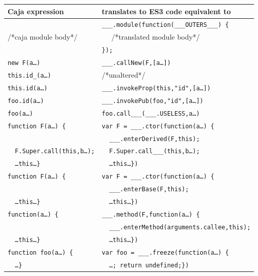 \documentclass[letterpaper,twocolumn,10pt]{article}
\newcommand{\code}[1]{{\tt {#1}}}              %
\begin{document}
\begin{table}
\begin{tabular}{ll}
  Caja expression   & translates to ES3 code equivalent to\\ 
  \hline
                 & \code{\_\_\_.module(function(\_\_\_OUTERS\_\_\_)\ \{} \\
  /*caja module body*/      
                 & \code{\ \ } /*translated module body*/ \\
                 & \code{\});} \\
  \hline
  \code{new F(a\ldots)}     & \code{\_\_\_.callNew(F,[a\ldots])} \\
  \code{this.id\_(a\ldots)} & /*unaltered*/ \\
  \code{this.id(a\ldots)} 
               & \code{\_\_\_.invokeProp(this,"id",[a\ldots])} \\
  \code{foo.id(a\ldots)}  
               & \code{\_\_\_.invokePub(foo,"id",[a\ldots])} \\
  \code{foo(a\ldots)}       & \code{foo.call\_\_\_(\_\_\_.USELESS,a\ldots)} \\
  \hline
  \code{function F(a\ldots)\ \{}  
                 & \code{var F = \_\_\_.ctor(function(a\ldots)\ \{} \\
                 & \code{\ \ \_\_\_.enterDerived(F,this);} \\
  \code{\ \ F.Super.call(this,b\ldots);}
                 & \code{\ \ F.Super.call\_\_\_(this,b\ldots);} \\
  \code{\ \ \ldots this\ldots\}}
                 & \code{\ \ \ldots this\ldots\})} \\
  \hline
  \code{function F(a\ldots)\ \{}  
                 & \code{var F = \_\_\_.ctor(function(a\ldots)\ \{} \\
                 & \code{\ \ \_\_\_.enterBase(F,this);}\\
  \code{\ \ \ldots this\ldots\}}
                 & \code{\ \ \ldots this\ldots\})}\\
  \hline
  \code{function(a\ldots)\ \{}    
                 & \code{\_\_\_.method(F,function(a\ldots)\ \{} \\
                 & \code{\ \ \_\_\_.enterMethod(arguments.callee,this);}\\
  \code{\ \ \ldots this\ldots\}}
                 & \code{\ \ \ldots this\ldots\})}\\
  
  \hline
  \code{function foo(a\ldots)\ \{}   
                 & \code{var foo = \_\_\_.freeze(function(a\ldots)\ \{} \\
  \code{\ \ \ldots\}}          
                 & \code{\ \ \ldots; return undefined;\})} \\
  

\end{tabular}
\end{table}
\end{document}
